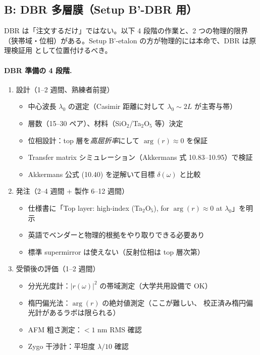 \documentclass[11pt,a4paper]{article}
\def\textbf#1{#1}%
\begin{document}
\subsection{B: DBR 多層膜（Setup B'-DBR 用）}

\begin{warnbox}
\textbf{DBR は「注文するだけ」ではない}。以下 4 段階の作業と、2 つの物理的限界
（狭帯域・位相）がある。Setup B'-etalon の方が物理的には本命で、DBR は原理検証用
として位置付けるべき。
\end{warnbox}

\paragraph{DBR 準備の 4 段階.}

\begin{enumerate}
\item \textbf{設計（1--2 週間、熟練者前提）}
  \begin{itemize}
  \item 中心波長 $\lambda_0$ の選定（Casimir 距離に対して $\lambda_0 \sim 2L$ が主寄与帯）
  \item 層数（15--30 ペア）、材料（SiO$_2$/Ta$_2$O$_5$ 等）決定
  \item \textbf{位相設計}：top 層を\emph{高屈折率}にして $\arg(r) \approx 0$ を保証
  \item Transfer matrix シミュレーション（Akkermans 式 10.83--10.95）で検証
  \item Akkermans 公式 (10.40) を逆解いて目標 $\delta(\omega)$ と比較
  \end{itemize}

\item \textbf{発注（2--4 週間 + 製作 6--12 週間）}
  \begin{itemize}
  \item 仕様書に「Top layer: high-index (Ta$_2$O$_5$), for $\arg(r) \approx 0$
    at $\lambda_0$」を\textbf{明示}
  \item 英語でベンダーと物理的根拠をやり取りできる必要あり
  \item 標準 supermirror は使えない（反射位相は top 層次第）
  \end{itemize}

\item \textbf{受領後の評価（1--2 週間）}
  \begin{itemize}
  \item \textbf{分光光度計}：$|r(\omega)|^2$ の帯域測定（大学共用設備で OK）
  \item \textbf{楕円偏光法}：$\arg(r)$ の絶対値測定（ここが難しい、
    校正済み楕円偏光計があるラボは限られる）
  \item \textbf{AFM 粗さ測定}：$< 1$ nm RMS 確認
  \item \textbf{Zygo 干渉計}：平坦度 $\lambda/10$ 確認
  \end{itemize}


\end{enumerate}
\end{document}
